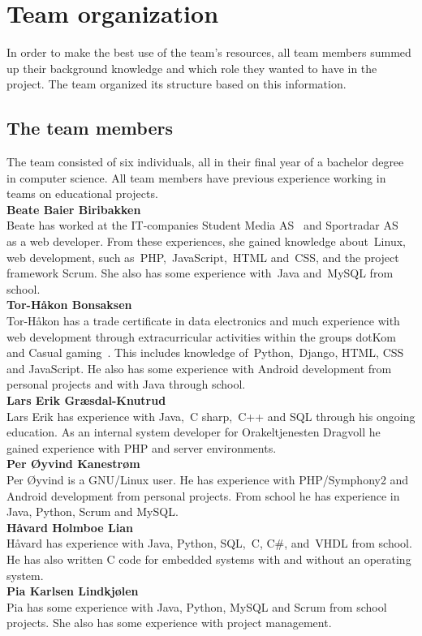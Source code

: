 
\section{Team organization}
In order to make the best use of the team's resources, all team members summed up their background knowledge and which role they wanted to have in the project. The team organized its structure based on this information.

\subsection{The team members}
The team consisted of six individuals, all in their final year of a bachelor degree in computer science. All team members have previous experience working in teams on educational projects.\\

\noindent\textbf{Beate Baier Biribakken}\\
Beate has worked at the IT-companies Student Media AS~\cite{studentmedia} and Sportradar AS~\cite{sportradar} as a web developer. From these experiences, she gained knowledge about~\gls{Linux}, web development, such as~\gls{PHP},~\gls{JavaScript},~\gls{HTML} and~\gls{CSS}, and the project framework Scrum. She also has some experience with~\gls{Java} and~\gls{MySQL} from school.\\

\noindent\textbf{Tor-Håkon Bonsaksen}\\
Tor-Håkon has a trade certificate in data electronics and much experience with web development through extracurricular activities within the groups dotKom~\cite{dotKom} and Casual gaming~\cite{casualgaming}. This includes knowledge of~\gls{Python},~\gls{Django}, HTML, CSS and JavaScript. He also has some experience with Android development from personal projects and with Java through school.\\

\noindent\textbf{Lars Erik Græsdal-Knutrud}\\
Lars Erik has experience with Java,~\gls{C sharp},~\gls{C++} and SQL through his ongoing education. As an internal system developer for Orakeltjenesten Dragvoll he gained experience with PHP and server environments. \\

\noindent\textbf{Per Øyvind Kanestrøm}\\
Per Øyvind is a GNU/Linux user. He has experience with PHP/Symphony2 and Android development from personal projects. From school he has experience in Java, Python, Scrum and MySQL.\\

\noindent\textbf{Håvard Holmboe Lian}\\
Håvard has experience with Java, Python, SQL,~\gls{C}, C\#, and~\gls{VHDL} from school. He has also written C code for embedded systems with and without an operating system.\\ 

\noindent\textbf{Pia	Karlsen	Lindkjølen}\\
Pia has some experience with Java, Python, MySQL and Scrum from school projects. She also has some experience with project management. 